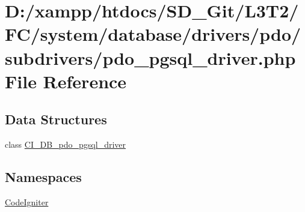 \hypertarget{system_2database_2drivers_2pdo_2subdrivers_2pdo__pgsql__driver_8php}{}\section{D\+:/xampp/htdocs/\+S\+D\+\_\+\+Git/\+L3\+T2/\+F\+C/system/database/drivers/pdo/subdrivers/pdo\+\_\+pgsql\+\_\+driver.php File Reference}
\label{system_2database_2drivers_2pdo_2subdrivers_2pdo__pgsql__driver_8php}
\subsection*{Data Structures}
\begin{DoxyCompactItemize}
\item 
class \hyperlink{class_c_i___d_b__pdo__pgsql__driver}{C\+I\+\_\+\+D\+B\+\_\+pdo\+\_\+pgsql\+\_\+driver}
\end{DoxyCompactItemize}
\subsection*{Namespaces}
\begin{DoxyCompactItemize}
\item 
 \hyperlink{namespace_code_igniter}{Code\+Igniter}
\end{DoxyCompactItemize}

